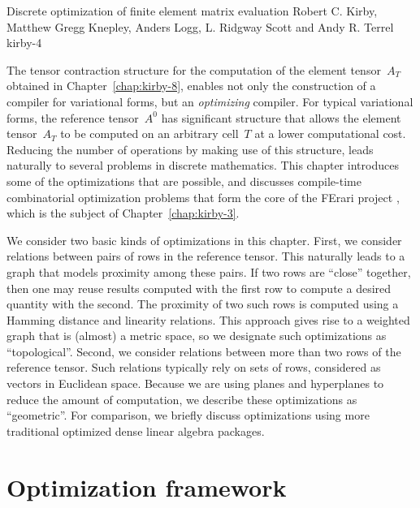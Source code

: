               {Discrete optimization of finite element matrix evaluation}
              {Robert C. Kirby, Matthew Gregg Knepley, Anders Logg, L. Ridgway Scott and Andy R. Terrel}
              {kirby-4}

The tensor contraction structure for the computation of the element
tensor~$A_T$ obtained in Chapter~\ref{chap:kirby-8}, enables not only the
construction of a compiler for variational forms, but an \emph{optimizing}
compiler. For typical variational forms, the reference tensor~$A^0$ has
significant structure that allows the element tensor~$A_T$ to be computed
on an arbitrary cell~$T$ at a lower computational cost. Reducing the
number of operations by making use of this structure, leads naturally
to several problems in discrete mathematics. This chapter introduces
some of the optimizations that are possible, and discusses compile-time
combinatorial optimization problems that form the core of the FErari
project \citep{KirbyLoggScottEtAl2006,KirbyScott2007,KirbyLogg2008},
which is the subject of Chapter~\ref{chap:kirby-3}.

We consider two basic kinds of optimizations in this chapter. First,
we consider relations between pairs of rows in the reference tensor.
This naturally leads to a graph that models proximity among these pairs.
If two rows are ``close'' together, then one may reuse results computed
with the first row to compute a desired quantity with the second.
The proximity of two such rows is computed using a Hamming distance
and linearity relations. This approach gives rise to a weighted graph
that is (almost) a metric space, so we designate such optimizations
as ``topological''.  Second, we consider relations between more than
two rows of the reference tensor. Such relations typically rely on
sets of rows, considered as vectors in Euclidean space. Because we
are using planes and hyperplanes to reduce the amount of computation,
we describe these optimizations as ``geometric''. For comparison, we
briefly discuss optimizations using more traditional optimized dense
linear algebra packages.

\section{Optimization framework}

